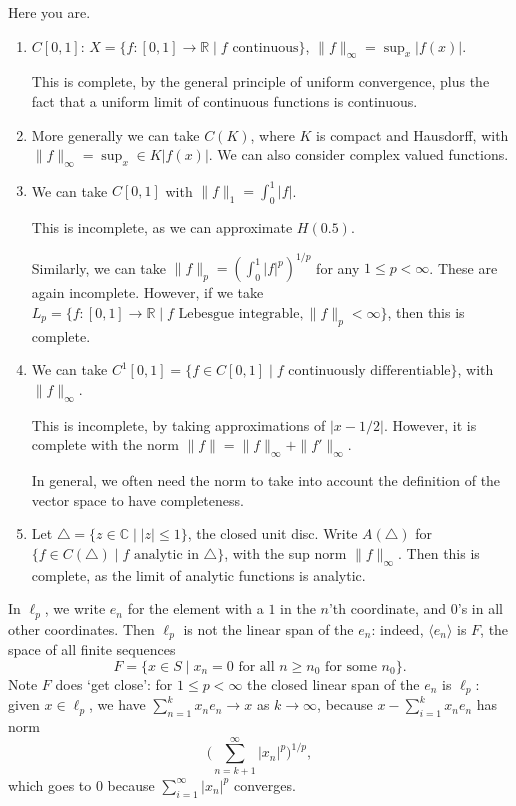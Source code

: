 \documentclass[12pt]{article}
\begin{document}
\begin{exbox}
	Here you are.
	\begin{enumerate}
		\item $C[0,1]$: $X = \{f : [0, 1] \to \mathbb{R} \mid f \text{ continuous}\}$, $\|f\|_\infty = \sup_x |f(x)|$.

			This is complete, by the general principle of uniform convergence, plus the fact that a uniform limit of continuous functions is continuous.
		\item More generally we can take $C(K)$, where $K$ is compact and Hausdorff, with $\|f\|_\infty = \sup_x \in K |f(x)|$. We can also consider complex valued functions.
		\item We can take $C[0,1]$ with $\|f\|_1 = \int_0^1 |f|$.

			This is incomplete, as we can approximate $H(0.5)$.

			Similarly, we can take $\|f\|_p = (\int_0^1 |f|^p)^{1/p}$ for any $1 \leq p < \infty$. These are again incomplete. However, if we take $L_p = \{f : [0, 1] \to \mathbb{R} \mid f \text{ Lebesgue integrable}, \|f\|_p < \infty\}$, then this is complete.
		\item We can take $C^1[0,1] = \{f \in C[0,1] \mid f \text{ continuously differentiable}\}$, with $\|f\|_\infty$.

			This is incomplete, by taking approximations of $|x - 1/2|$. However, it is complete with the norm $\|f\| = \|f\|_\infty + \|f'\|_\infty$.

			In general, we often need the norm to take into account the definition of the vector space to have completeness.
		\item Let $\triangle = \{z \in \mathbb{C} \mid |z| \leq 1\}$, the closed unit disc. Write $A(\triangle)$ for $\{f \in C(\triangle) \mid f \text{ analytic in } \triangle\}$, with the sup norm $\|f\|_\infty$. Then this is complete, as the limit of analytic functions is analytic.
	\end{enumerate}
	
\end{exbox}



In $\ell_p$, we write $e_n$ for the element with a $1$ in the $n$'th coordinate, and $0$'s in all other coordinates. Then $\ell_p$ is not the linear span of the $e_n$: indeed, $\langle e_n \rangle$ is $F$, the space of all finite sequences
\[
	F = \{x \in S \mid x_n = 0 \text{ for all } n \geq n_0 \text{ for some } n_0\}.
\]
Note $F$ does `get close': for $1 \leq p < \infty$ the closed linear span of the $e_n$ is $\ell_p$: given $x \in \ell_p$, we have $\sum_{n=1}^{k} x_n e_n \to x$ as $k \to \infty$, because $x - \sum_{i = 1}^{k} x_n e_n$ has norm
\[
\Biggl( \sum_{n = k+1}^{\infty} |x_n|^{p} \Biggr)^{1/p},
\]
which goes to $0$ because $\sum_{i = 1}^{\infty} |x_n|^{p}$ converges.
\end{document}
